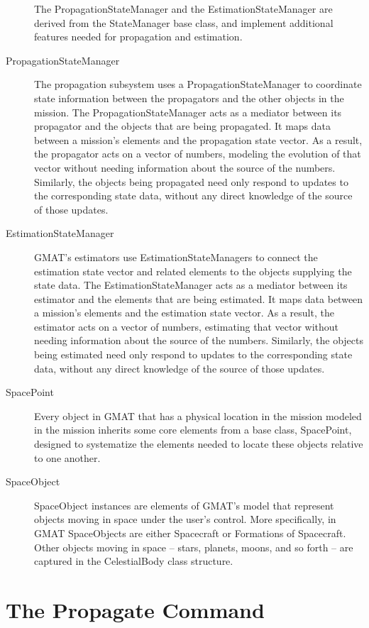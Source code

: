 \documentclass[10pt]{article}
\begin{document}
\begin{description}
The PropagationStateManager and the EstimationStateManager are derived from the StateManager base class, and implement additional features needed for propagation and estimation.
\item[PropagationStateManager]  The propagation subsystem uses a PropagationStateManager to coordinate state information between the propagators and the other objects in the mission.  The PropagationStateManager acts as a mediator between its propagator and the objects that are being propagated.  It maps data between a mission's elements and the propagation state vector.   As a result, the propagator acts on a vector of numbers, modeling the evolution of that vector without needing information about the source of the numbers.  Similarly, the objects being propagated need only respond to updates to the corresponding state data, without any direct knowledge of the source of those updates.
\item[EstimationStateManager]  GMAT's estimators use EstimationStateManagers to connect the estimation state vector and related elements to the objects supplying the state data.  The EstimationStateManager acts as a mediator between its estimator and the elements that are being estimated.  It maps data between a mission's elements and the estimation state vector.   As a result, the estimator acts on a vector of numbers, estimating that vector without needing information about the source of the numbers.  Similarly, the objects being estimated need only respond to updates to the corresponding state data, without any direct knowledge of the source of those updates.
\item[SpacePoint]  Every object in GMAT that has a physical location in the mission modeled in the mission inherits some core elements from a base class, SpacePoint, designed to systematize the elements needed to locate these objects relative to one another.
\item[SpaceObject]  SpaceObject instances are elements of GMAT's model that represent objects moving in space under the user's control.  More specifically, in GMAT SpaceObjects are either Spacecraft or Formations of Spacecraft.  Other objects moving in space -- stars, planets, moons, and so forth -- are captured in the CelestialBody class structure.
\end{description}

\section{The Propagate Command}
\end{document}
